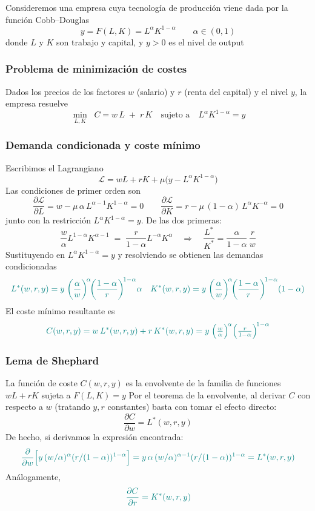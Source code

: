\documentclass{article}
\begin{document}
Consideremos una empresa cuya tecnología de producción viene dada por la función Cobb–Douglas
\[
y = F(L,K) = L^\alpha K^{1-\alpha}
\qquad \alpha\in(0,1)
\]
donde \(L\) y \(K\) son trabajo y capital, y \(y>0\) es el nivel de output  

\subsubsection*{Problema de minimización de costes}

Dados los precios de los factores \(w\) (salario) y \(r\) (renta del capital) y el nivel \(y\), la empresa resuelve
\[
\min_{L,K}\;\; C = w\,L \;+\; r\,K
\quad\text{sujeto a}\quad
L^\alpha K^{1-\alpha} = y
\]

\subsubsection*{Demanda condicionada y coste mínimo}

Escribimos el Lagrangiano
\[
\mathcal L = wL + rK + \mu\bigl(y - L^\alpha K^{1-\alpha}\bigr)
\]
Las condiciones de primer orden son
\[
\frac{\partial\mathcal L}{\partial L}
= w - \mu\,\alpha\,L^{\alpha-1}K^{1-\alpha} = 0
\qquad
\frac{\partial\mathcal L}{\partial K}
= r - \mu\,(1-\alpha)\,L^\alpha K^{-\alpha} = 0
\]
junto con la restricción \(L^\alpha K^{1-\alpha}=y\). De las dos primeras:
\[
\frac{w}{\alpha}L^{1-\alpha}K^{\alpha-1}
\;=\;
\frac{r}{1-\alpha}L^{-\alpha}K^\alpha
\quad\Longrightarrow\quad
\frac{L^*}{K^*} = \frac{\alpha}{1-\alpha}\,\frac{r}{w}
\]
Sustituyendo en \(L^{\alpha}K^{1-\alpha}=y\) y resolviendo se obtienen las demandas condicionadas
\[\color{teal}
L^*(w,r,y)
= y\;\biggl(\frac{\alpha}{w}\biggr)^{\!\alpha}\!\biggl(\frac{1-\alpha}{r}\biggr)^{\!1-\alpha}\alpha
\quad
K^*(w,r,y)
= y\;\biggl(\frac{\alpha}{w}\biggr)^{\!\alpha}\!\biggl(\frac{1-\alpha}{r}\biggr)^{\!1-\alpha}(1-\alpha)
\]
El coste mínimo resultante es
\[\color{teal}
C(w,r,y)
= w\,L^*(w,r,y) + r\,K^*(w,r,y)
= y\;\Bigl(\tfrac{w}{\alpha}\Bigr)^{\!\alpha}
        \Bigl(\tfrac{r}{1-\alpha}\Bigr)^{\!1-\alpha}
\]

\subsubsection*{Lema de Shephard}

La función de coste \(C(w,r,y)\) es la envolvente de la familia de funciones \(wL + rK\) sujeta a \(F(L,K)=y\)  
Por el teorema de la envolvente, al derivar \(C\) con respecto a \(w\) (tratando \(y,r\) constantes) basta con tomar el efecto directo:
\[
\frac{\partial C}{\partial w}
= L^*(w,r,y)
\]
De hecho, si derivamos la expresión encontrada:
\[\color{teal}
\frac{\partial}{\partial w}
\Bigl[y\,(w/\alpha)^\alpha(r/(1-\alpha))^{1-\alpha}\Bigr]
= y\,\alpha\,(w/\alpha)^{\alpha-1}(r/(1-\alpha))^{1-\alpha}
= L^*(w,r,y)
\]
Análogamente,
\[\color{teal}
\frac{\partial C}{\partial r}
= K^*(w,r,y)
\]
\end{document}
